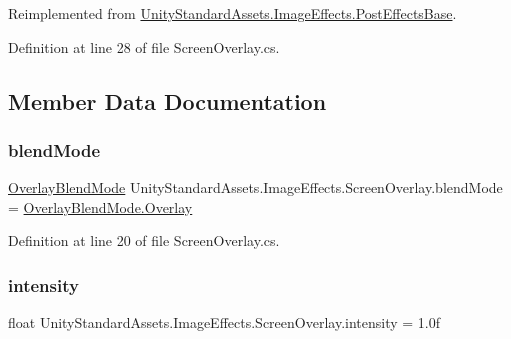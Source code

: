 Reimplemented from \mbox{\hyperlink{class_unity_standard_assets_1_1_image_effects_1_1_post_effects_base_a8866612b25b7158b932efd3b832188f8}{Unity\+Standard\+Assets.\+Image\+Effects.\+Post\+Effects\+Base}}.



Definition at line 28 of file Screen\+Overlay.\+cs.



\subsection{Member Data Documentation}
\mbox{\label{class_unity_standard_assets_1_1_image_effects_1_1_screen_overlay_a4b011caccdf62e51d74408722e9fcb78}} 
\subsubsection{\texorpdfstring{blend\+Mode}{blendMode}}
{\footnotesize\ttfamily \mbox{\hyperlink{class_unity_standard_assets_1_1_image_effects_1_1_screen_overlay_a30569b65d427b6bed92c74463682cb00}{Overlay\+Blend\+Mode}} Unity\+Standard\+Assets.\+Image\+Effects.\+Screen\+Overlay.\+blend\+Mode = \mbox{\hyperlink{class_unity_standard_assets_1_1_image_effects_1_1_screen_overlay_a30569b65d427b6bed92c74463682cb00a6b551379c3c0b59326abdaf3b4395bd3}{Overlay\+Blend\+Mode.\+Overlay}}}



Definition at line 20 of file Screen\+Overlay.\+cs.

\mbox{\label{class_unity_standard_assets_1_1_image_effects_1_1_screen_overlay_a4a0a5bfcd436b7461f47ebf98acb3a04}} 
\subsubsection{\texorpdfstring{intensity}{intensity}}
{\footnotesize\ttfamily float Unity\+Standard\+Assets.\+Image\+Effects.\+Screen\+Overlay.\+intensity = 1.\+0f}



